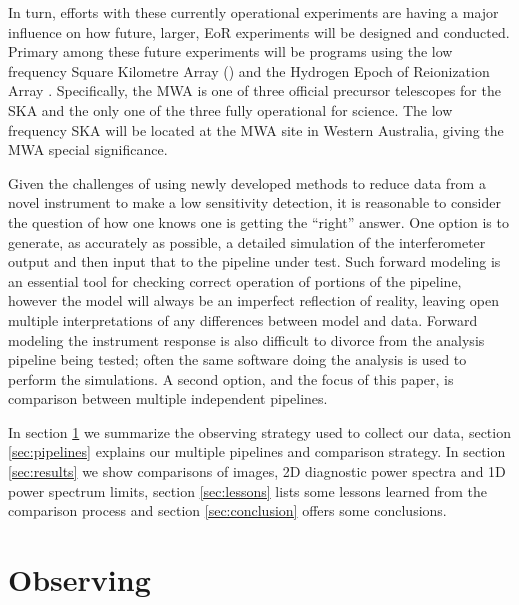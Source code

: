 \documentclass[twolcolumn]{emulateapj}
\begin{document}
In turn, efforts with these currently operational experiments are having a major influence on how future, larger, EoR experiments will be designed and conducted.  Primary among these future experiments will be programs using the low frequency Square Kilometre Array (\cite{2014aska.confE...1K}) and the Hydrogen Epoch of Reionization Array \citep[HERA][]{Pober:2014p10390}.  Specifically, the MWA is one of three official precursor telescopes for the SKA and the only one of the three fully operational for science.  The low frequency SKA will be located at the MWA site in Western Australia, giving the MWA special significance.

Given the challenges of using newly developed methods to reduce data from a novel instrument to make a low sensitivity detection, it is reasonable to consider the question of how one knows one is getting the ``right'' answer.  One option is to generate, as accurately as possible, a detailed simulation of the interferometer output and then input that to the pipeline under test.  Such forward modeling is an essential tool for checking correct operation of portions of the pipeline, however the model will always be an imperfect reflection of reality, leaving open multiple interpretations of any differences between model and data.  Forward modeling the instrument response is also difficult to divorce from the analysis pipeline being tested; often the same software doing the analysis is used to perform the simulations. A second option, and the focus of this paper, is comparison between multiple independent pipelines.






In section \ref{sec:observing} we summarize the observing strategy used to collect our data, section \ref{sec:pipelines} explains our multiple pipelines and comparison strategy. In section \ref{sec:results} we show comparisons of images, 2D diagnostic power spectra and 1D power spectrum limits, section \ref{sec:lessons} lists some lessons learned from the comparison process and section \ref{sec:conclusion} offers some conclusions.



\section{Observing}
\label{sec:observing}
\end{document}
